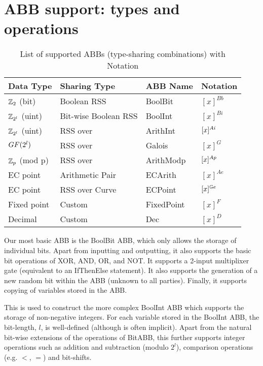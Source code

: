 \section{ABB support: types and operations}

\begin{table}
\begin{tabular}{|l|l|l|l|}
	\hline
	Data Type 	& Sharing Type		& ABB Name	& Notation \\ \hline
	$\mathbb{Z}_2$ (bit) 	& Boolean RSS		& BoolBit  	& $[x]^{Bb}$ \\ \hline
	$\mathbb{Z}_{2^l}$ (uint) & Bit-wise Boolean RSS	& BoolInt	& $[x]^{Bi}$ \\ \hline
	$\mathbb{Z}_{2^l}$ (uint) & RSS over \Ztwol	& ArithInt	& $[x]^{Ai}$ \\ \hline
	$GF(2^l)$ 	& RSS over \GFtwol	& Galois	& $[x]^{G}$ \\ \hline
	$\mathbb{Z}_p$ (mod p)	& RSS over \Zp		& ArithModp	& $[x]^{Ap}$ \\ \hline
	EC point 	& Arithmetic Pair	& ECArith	& $[x]^{Ae}$ \\ \hline
	EC point 	& RSS over Curve	& ECPoint 	& $[x]^{\mathbb{G} e}$ \\ \hline
	Fixed point 	& Custom		& FixedPoint	& $[x]^{F}$ \\ \hline
	Decimal		& Custom		& Dec	 	& $[x]^{D}$ \\ \hline 
\end{tabular}
	\caption{List of supported ABBs (type-sharing combinations) with Notation}
	\label{tab:abb_list}
\end{table}

Our most basic ABB is the BoolBit ABB, which only allows the storage of individual bits.
Apart from inputting and outputting, it also supports the basic 
bit operations of XOR, AND, OR, and NOT. 
It supports a 2-input multiplixer gate (equivalent to an IfThenElse statement).
It also supports the generation of a new random bit within the ABB (unknown to all parties).
Finally, it supports copying of variables stored in the ABB.

This is used to construct the more complex BoolInt ABB which supports the storage
of non-negative integers. 
For each variable stored in the BoolInt ABB, the bit-length, $l$, is well-defined
(although is often implicit).
Apart from the natural bit-wise extensions of the operations of BitABB, 
this further supports integer operations such as addition and subtraction (modulo $2^l$),
comparison operations (e.g. $<$, $=$) and bit-shifts.

